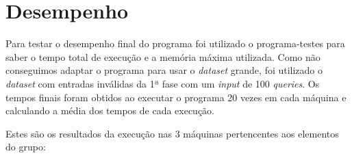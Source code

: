 \documentclass[12pt,a4paper]{report}
\begin{document}
    
    \chapter{Desempenho}

     Para testar o desempenho final do programa foi utilizado o programa-testes para saber o tempo total de execução e a memória máxima utilizada. Como não conseguimos adaptar o programa para usar o \textit{dataset} grande, foi utilizado o \textit{dataset} com entradas inválidas da 1ª fase com um \textit{input} de 100 \textit{queries}. Os tempos finais foram obtidos ao executar o programa 20 vezes em cada máquina e calculando a média dos tempos de cada execução.

    \par Estes são os resultados da execução nas 3 máquinas pertencentes aos elementos do grupo:
    
\end{document}
